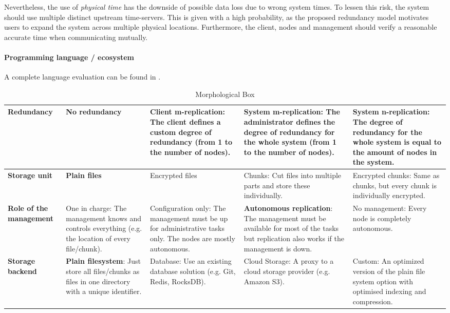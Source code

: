 Nevertheless, the use of \emph{physical time} has the downside of possible data loss due to wrong system times. To lessen this risk, the system should use multiple distinct upstream time-servers. This is given with a high probability, as the proposed redundancy model motivates users to expand the system across multiple physical locations. Furthermore, the client, nodes and management should verify a reasonable accurate time when communicating mutually.

\paragraph{Programming language / ecosystem}
A complete language evaluation can be found in .

\begin{table}
	\centering
	\caption[Morphological Box]{Morphological Box}
	\label{tbl:morphological-box}
    \begin{tabu}{X | X X X X}
		\hline
          \textbf{Redundancy}
          & No redundancy
          & Client m-replication: The client defines a custom degree of redundancy (from 1 to the number of nodes).
          & System m-replication: The administrator defines the degree of redundancy for the whole system (from 1 to the number of nodes).
          & \textbf{System n-replication}: The degree of redundancy for the whole system is equal to the amount of nodes in the system.
          \\ \hline

          \textbf{Storage unit}
          & \textbf{Plain files}
          & Encrypted files
          & Chunks: Cut files into multiple parts and store these individually.
          & Encrypted chunks: Same as chunks, but every chunk is individually encrypted.
          \\ \hline


          \textbf{Role of the management}
          & One in charge: The management knows and controls everything (e.g. the location of every file/chunk).
          & Configuration only: The management must be up for administrative tasks only. The nodes are mostly autonomous.
          & \textbf{Autonomous replication}: The management must be available for most of the tasks but replication also works if the management is down.
          & No management: Every node is completely autonomous.
          \\ \hline


          \textbf{Storage backend}
          & \textbf{Plain filesystem}: Just store all files/chunks as files in one directory with a unique identifier.
          & Database: Use an existing database solution (e.g. Git, Redis, RocksDB).
          & Cloud Storage: A proxy to a cloud storage provider (e.g. Amazon S3).
          & Custom: An optimized version of the plain file system option with optimised indexing and compression.
          \\ \hline



\end{tabu}
\end{table}
